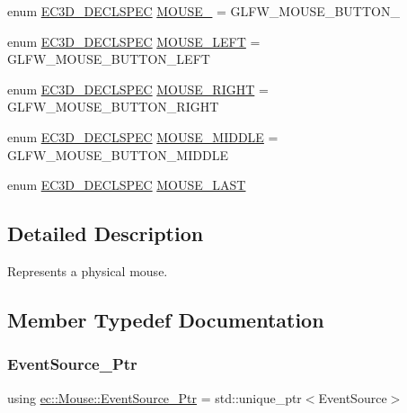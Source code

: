 \begin{DoxyCompactItemize}
\item 
enum \mbox{\hyperlink{_common_8h_aac42573e202ca3dd4d259c81691e2369}{E\+C3\+D\+\_\+\+D\+E\+C\+L\+S\+P\+EC}} \mbox{\hyperlink{classec_1_1_mouse_ad8e689eef8a2d016daf1a1ab1827a2bb}{M\+O\+U\+S\+E\+\_}} = G\+L\+F\+W\+\_\+\+M\+O\+U\+S\+E\+\_\+\+B\+U\+T\+T\+O\+N\+\_
\item 
enum \mbox{\hyperlink{_common_8h_aac42573e202ca3dd4d259c81691e2369}{E\+C3\+D\+\_\+\+D\+E\+C\+L\+S\+P\+EC}} \mbox{\hyperlink{classec_1_1_mouse_a475b1f4a649a42df221e6bc70c65ad95}{M\+O\+U\+S\+E\+\_\+\+L\+E\+FT}} = G\+L\+F\+W\+\_\+\+M\+O\+U\+S\+E\+\_\+\+B\+U\+T\+T\+O\+N\+\_\+\+L\+E\+FT
\item 
enum \mbox{\hyperlink{_common_8h_aac42573e202ca3dd4d259c81691e2369}{E\+C3\+D\+\_\+\+D\+E\+C\+L\+S\+P\+EC}} \mbox{\hyperlink{classec_1_1_mouse_a433aac3a68d060b7f330976e5855ddad}{M\+O\+U\+S\+E\+\_\+\+R\+I\+G\+HT}} = G\+L\+F\+W\+\_\+\+M\+O\+U\+S\+E\+\_\+\+B\+U\+T\+T\+O\+N\+\_\+\+R\+I\+G\+HT
\item 
enum \mbox{\hyperlink{_common_8h_aac42573e202ca3dd4d259c81691e2369}{E\+C3\+D\+\_\+\+D\+E\+C\+L\+S\+P\+EC}} \mbox{\hyperlink{classec_1_1_mouse_a0fbdf11d1d258a805821e37141f95131}{M\+O\+U\+S\+E\+\_\+\+M\+I\+D\+D\+LE}} = G\+L\+F\+W\+\_\+\+M\+O\+U\+S\+E\+\_\+\+B\+U\+T\+T\+O\+N\+\_\+\+M\+I\+D\+D\+LE
\item 
enum \mbox{\hyperlink{_common_8h_aac42573e202ca3dd4d259c81691e2369}{E\+C3\+D\+\_\+\+D\+E\+C\+L\+S\+P\+EC}} \mbox{\hyperlink{classec_1_1_mouse_ad36d2595387f7a090615c4ee6012f2ef}{M\+O\+U\+S\+E\+\_\+\+L\+A\+ST}}
\end{DoxyCompactItemize}


\subsection{Detailed Description}
Represents a physical mouse. 

\subsection{Member Typedef Documentation}
\mbox{\label{classec_1_1_mouse_a6aa210c1821f23f8685a544a587ae11a}} 
\subsubsection{\texorpdfstring{Event\+Source\+\_\+\+Ptr}{EventSource\_Ptr}}
{\footnotesize\ttfamily using \mbox{\hyperlink{classec_1_1_mouse_a6aa210c1821f23f8685a544a587ae11a}{ec\+::\+Mouse\+::\+Event\+Source\+\_\+\+Ptr}} =  std\+::unique\+\_\+ptr$<$Event\+Source$>$}



